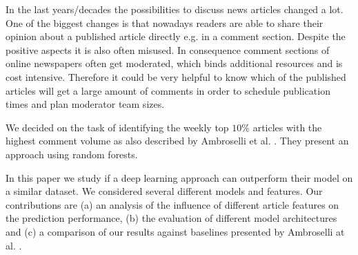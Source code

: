 In the last years/decades the possibilities to discuss news articles changed a lot. One of the biggest changes is that nowadays readers are able to share their opinion about a published article directly e.g. in a comment section. Despite the positive aspects it is also often misused. In consequence comment sections of online newspapers often get moderated, which binds additional resources and is cost intensive. Therefore it could be very helpful to know which of the published articles will get a large amount of comments in order to schedule publication times and plan moderator team sizes.

We decided on the task of identifying the weekly top $10\%$ articles with the highest comment volume as also described by Ambroselli et al. \cite{ambroselli2018prediction}. They present an approach using random forests.

In this paper we study if a deep learning approach can outperform their model on a similar dataset. We considered several different models and features.
Our contributions are (a) an analysis of the influence of different article features on the prediction performance, (b) the evaluation of different model architectures and (c) a comparison of our results against baselines presented by Ambroselli at al. \cite{ambroselli2018prediction}.
